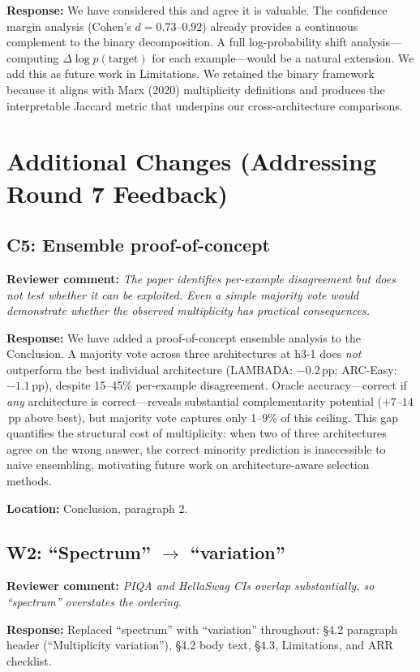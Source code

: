 \documentclass[11pt]{article}
\newcommand{\reviewer}[1]{\textcolor{reviewercolor}{\textbf{Reviewer comment:} \textit{#1}}}
\newcommand{\response}[1]{\textcolor{responsecolor}{\textbf{Response:} #1}}
\newcommand{\location}[1]{\textbf{Location:} #1}
\begin{document}
\response{We have considered this and agree it is valuable. The confidence margin analysis (Cohen's $d = 0.73$--$0.92$) already provides a continuous complement to the binary decomposition. A full log-probability shift analysis---computing $\Delta \log p(\text{target})$ for each example---would be a natural extension. We add this as future work in Limitations. We retained the binary framework because it aligns with Marx (2020) multiplicity definitions and produces the interpretable Jaccard metric that underpins our cross-architecture comparisons.}

\section*{Additional Changes (Addressing Round 7 Feedback)}

\subsection*{C5: Ensemble proof-of-concept}

\reviewer{The paper identifies per-example disagreement but does not test whether it can be exploited. Even a simple majority vote would demonstrate whether the observed multiplicity has practical consequences.}

\response{We have added a proof-of-concept ensemble analysis to the Conclusion. A majority vote across three architectures at h3-1 does \emph{not} outperform the best individual architecture (LAMBADA: $-0.2$\,pp; ARC-Easy: $-1.1$\,pp), despite 15--45\% per-example disagreement. Oracle accuracy---correct if \emph{any} architecture is correct---reveals substantial complementarity potential ($+7$--$14$\,pp above best), but majority vote captures only 1--9\% of this ceiling. This gap quantifies the structural cost of multiplicity: when two of three architectures agree on the wrong answer, the correct minority prediction is inaccessible to naive ensembling, motivating future work on architecture-aware selection methods.}

\location{Conclusion, paragraph 2.}

\subsection*{W2: ``Spectrum'' $\to$ ``variation''}

\reviewer{PIQA and HellaSwag CIs overlap substantially, so ``spectrum'' overstates the ordering.}

\response{Replaced ``spectrum'' with ``variation'' throughout: \S4.2 paragraph header (``Multiplicity variation''), \S4.2 body text, \S4.3, Limitations, and ARR checklist.}
\end{document}
